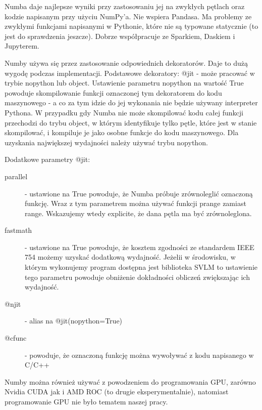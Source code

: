 Numba daje najlepsze wyniki przy zastosowaniu jej na zwykłych pętlach oraz kodzie napisanym przy użyciu NumPy’a. Nie wspiera Pandasa. Ma problemy ze zwykłymi funkcjami napisanymi w Pythonie, które nie są typowane statycznie (to jest do sprawdzenia jeszcze). Dobrze współpracuje ze Sparkiem, Daskiem i Jupyterem.

Numby używa się przez zastosowanie odpowiednich dekoratorów. Daje to dużą wygodę podczas implementacji. Podstawowe dekoratory:
@jit - może pracować w trybie nopython lub object. Ustawienie parametru nopython na wartość True powoduje skompilowanie funkcji oznaczonej tym dekoratorem do kodu maszynowego - a co za tym idzie do jej wykonania nie będzie używany interpreter Pythona. W przypadku gdy Numba nie może skompilować kodu całej funkcji  przechodzi do trybu object, w którym identyfikuje tylko pętle, które jest w stanie skompilować, i kompiluje je jako osobne funkcje do kodu maszynowego.  Dla uzyskania największej wydajności należy używać trybu nopython.

Dodatkowe parametry @jit:
\begin{description}
    \item [parallel] - ustawione na True powoduje, że Numba próbuje zrównoleglić oznaczoną funkcję. Wraz z tym parametrem można używać funkcji prange zamiast range. Wskazujemy wtedy explicite, że dana pętla ma być zrównoleglona.
    \item [fastmath]  - ustawione na True powoduje, że kosztem zgodności ze standardem IEEE 754 możemy uzyskać dodatkową wydajność. Jeżelii w środowisku, w którym wykonujemy program dostępna jest biblioteka SVLM to ustawienie tego parametru powoduje obniżenie dokładności obliczeń zwiększając ich wydajność.
    \item [@njit] - alias na @jit(nopython=True)
    \item [@cfunc] - powoduje, że oznaczoną funkcję można wywoływać z kodu napisanego w C/C++
\end{description}

Numby można również używać z powodzeniem do programowania GPU, zarówno Nvidia CUDA jak i AMD ROC (to drugie eksperymentalnie), natomiast programowanie GPU nie było tematem naszej pracy.

